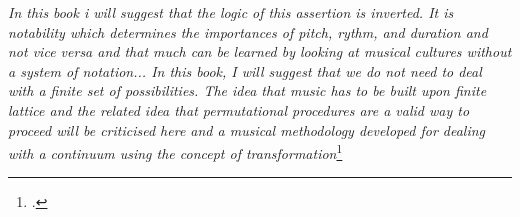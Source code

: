 \begin{center}
    \vspace{0.5cm}
    \textit{In this book i will suggest that the logic of this assertion is inverted.
    It is notability which determines the importances of pitch, rythm, and duration and
    not vice versa and that much can be learned by looking at 
    musical cultures without a system of notation... 
    In this book, I will suggest that we do not need to deal with a finite set of
    possibilities. The idea that music has to be built upon  finite lattice and the
    related idea that permutational procedures are a valid way to proceed will
    be criticised here and a musical methodology developed for dealing with a
    continuum using the concept of transformation}\footcite{wishart_on_sonic_art}
\vspace{0.5cm}
\end{center}

